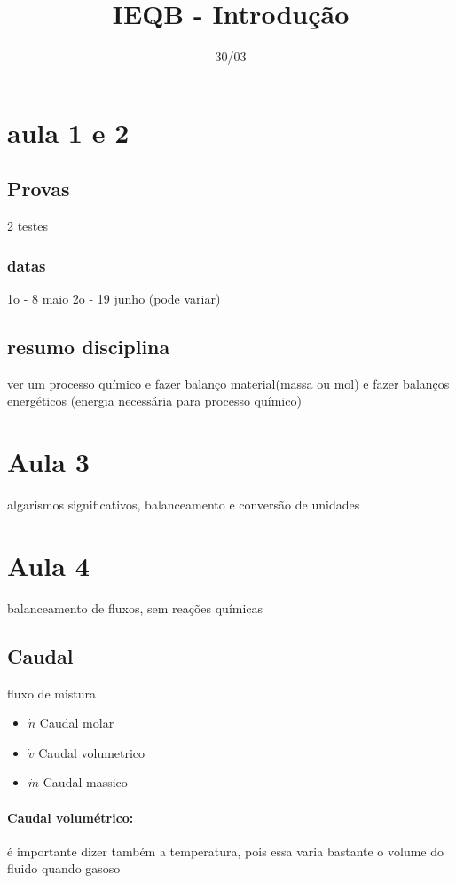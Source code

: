 \documentclass[12pt]{article}
\begin{document}
\title{IEQB - Introdução}
\date{30/03}

\maketitle
\tableofcontents
\break

\section{aula 1 e 2}

\subsection{Provas}
2 testes

\subsubsection{datas}
1o - 8 maio
2o - 19 junho (pode variar)

\subsection{resumo disciplina}
ver um processo químico e fazer balanço material(massa ou mol) e fazer balanços energéticos (energia necessária para processo químico)

\section{Aula 3}
algarismos significativos, balanceamento e conversão de unidades

\section{Aula 4}
balanceamento de fluxos, sem reações químicas

\subsection{Caudal}
fluxo de mistura
\begin{itemize}
\item $\dot n$ Caudal molar 
\item $\dot v$ Caudal volumetrico
\item $\dot m$ Caudal massico
\end{itemize}

\paragraph{Caudal volumétrico:} é importante dizer também a temperatura, pois essa varia bastante o volume do fluido quando gasoso
\end{document}
